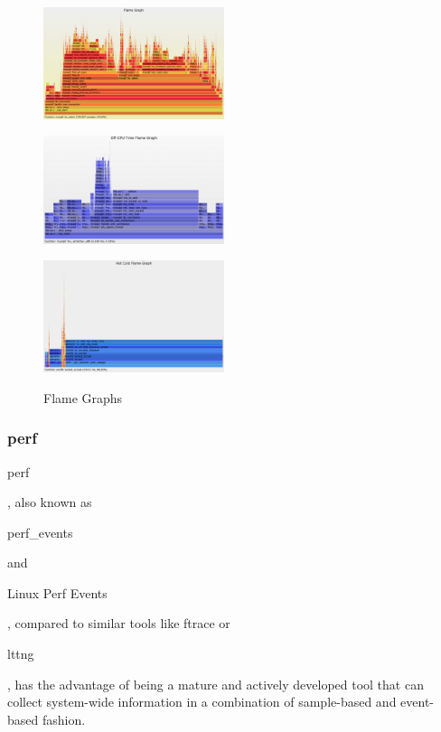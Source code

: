 \documentclass[10pt]{article}
\begin{document}
\begin{figure}
\begin{minipage}[b]{.3\linewidth}
\centering%
\includegraphics[width=150pt]{images/oncpu}
\label{fig:1a}
\end{minipage}%
\hfill%
\begin{minipage}[b]{.3\linewidth}
\centering%
\includegraphics[width=150pt]{images/offcpu}
\label{fig:1b}
\end{minipage}
\hfill%
\begin{minipage}[b]{.3\linewidth}
\centering%
\includegraphics[width=150pt]{images/hotcold}
\label{fig:1c}
\end{minipage}
\caption{Flame Graphs}\label{fig:flamegraph}
\end{figure}

\subsubsection{perf}

\begin{tt}perf\end{tt}, also known as \begin{tt}perf\_events\end{tt} and
\begin{tt}Linux Perf Events\end{tt}, compared to similar tools like ftrace or
\begin{tt}lttng\end{tt}, has the advantage of being a mature and actively
developed tool that can collect system-wide information in a combination of
sample-based and event-based fashion.
\end{document}

